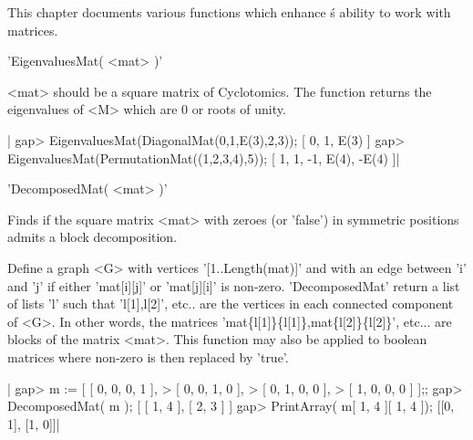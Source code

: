 

This  chapter documents various functions  which enhance \GAP\'s ability
to work with matrices.

%
%

'EigenvaluesMat( <mat> )'

<mat>  should be a  square matrix of  Cyclotomics. The function returns the
eigenvalues of <M> which are 0 or roots of unity.

|    gap> EigenvaluesMat(DiagonalMat(0,1,E(3),2,3));
    [ 0, 1, E(3) ]
    gap> EigenvaluesMat(PermutationMat((1,2,3,4),5));
    [ 1, 1, -1, E(4), -E(4) ]|

%
%

'DecomposedMat( <mat> )'

Finds  if the  square matrix  <mat> with  zeroes (or  'false') in symmetric
positions admits a block decomposition.

Define  a  graph  <G>  with  vertices  '[1..Length(mat)]'  and with an edge
between  'i'  and  'j'  if  either  'mat[i][j]' or 'mat[j][i]' is non-zero.
'DecomposedMat' return a list of lists 'l' such that 'l[1],l[2]', etc.. are
the  vertices  in  each  connected  component  of  <G>. In other words, the
matrices  'mat\{l[1]\}\{l[1]\},mat\{l[2]\}\{l[2]\}',  etc...  are blocks of
the  matrix <mat>.  This function  may also  be applied to boolean matrices
where non-zero is then replaced by 'true'.

|    gap> m := [ [  0,  0,  0,  1 ],
    >           [  0,  0,  1,  0 ],
    >           [  0,  1,  0,  0 ],
    >           [  1,  0,  0,  0 ] ];;
    gap> DecomposedMat( m );
    [ [ 1, 4 ], [ 2, 3 ] ]
    gap> PrintArray( m{[ 1, 4 ]}{[ 1, 4 ]});
    [[0, 1],
     [1, 0]]|

%
%

